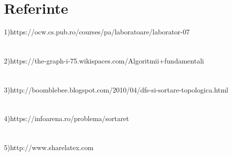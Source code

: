 \documentclass[14pt]{article}
\begin{document}
\section*{Referinte}
\large 
1)https://ocw.cs.pub.ro/courses/pa/laboratoare/laborator-07
\\
\\\vspace{6mm}
\\
2)https://the-graph-i-75.wikispaces.com/Algoritmii+fundamentali
\\
\\\vspace{6mm}
\\
3)http://boomblebee.blogspot.com/2010/04/dfs-si-sortare-topologica.html
\\
\\\vspace{6mm}
\\
4)https://infoarena.ro/problema/sortaret
\\
\\\vspace{6mm}
\\
5)http://www.sharelatex.com
\end{document}
